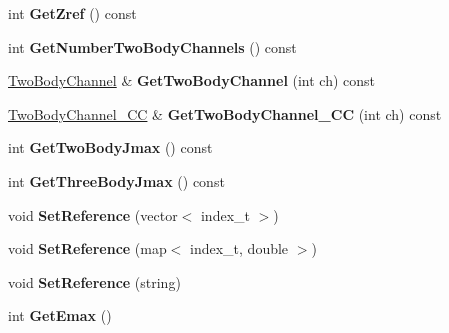 \begin{DoxyCompactItemize}
\item 
int {\bfseries Get\+Zref} () const \hypertarget{classModelSpace_af23deb75791febf7bd5cc711ab0a4b33}{}\label{classModelSpace_af23deb75791febf7bd5cc711ab0a4b33}

\item 
int {\bfseries Get\+Number\+Two\+Body\+Channels} () const \hypertarget{classModelSpace_a7c0b9152d68e069f9774078bd2a429b7}{}\label{classModelSpace_a7c0b9152d68e069f9774078bd2a429b7}

\item 
\hyperlink{classTwoBodyChannel}{Two\+Body\+Channel} \& {\bfseries Get\+Two\+Body\+Channel} (int ch) const \hypertarget{classModelSpace_ab2c315fd347fe93dd63246dea3d02f35}{}\label{classModelSpace_ab2c315fd347fe93dd63246dea3d02f35}

\item 
\hyperlink{classTwoBodyChannel__CC}{Two\+Body\+Channel\+\_\+\+CC} \& {\bfseries Get\+Two\+Body\+Channel\+\_\+\+CC} (int ch) const \hypertarget{classModelSpace_a6709279838180ef0a6745320c9ad6926}{}\label{classModelSpace_a6709279838180ef0a6745320c9ad6926}

\item 
int {\bfseries Get\+Two\+Body\+Jmax} () const \hypertarget{classModelSpace_a3cbf323130388fae05fed1b59c5bac90}{}\label{classModelSpace_a3cbf323130388fae05fed1b59c5bac90}

\item 
int {\bfseries Get\+Three\+Body\+Jmax} () const \hypertarget{classModelSpace_a23ec9e8797755abfc0986b2e2c73a056}{}\label{classModelSpace_a23ec9e8797755abfc0986b2e2c73a056}

\item 
void {\bfseries Set\+Reference} (vector$<$ index\+\_\+t $>$)\hypertarget{classModelSpace_a95d08c02f658a240a8365340512cd8fa}{}\label{classModelSpace_a95d08c02f658a240a8365340512cd8fa}

\item 
void {\bfseries Set\+Reference} (map$<$ index\+\_\+t, double $>$)\hypertarget{classModelSpace_ab1f2a40d98599c6f598a300b26ed6d40}{}\label{classModelSpace_ab1f2a40d98599c6f598a300b26ed6d40}

\item 
void {\bfseries Set\+Reference} (string)\hypertarget{classModelSpace_a5b1edcca9207a847c8ad9a5da61d2083}{}\label{classModelSpace_a5b1edcca9207a847c8ad9a5da61d2083}

\item 
int {\bfseries Get\+Emax} ()\hypertarget{classModelSpace_a68589449fbb7240d68877fcdc133a1d7}{}\label{classModelSpace_a68589449fbb7240d68877fcdc133a1d7}


\end{DoxyCompactItemize}
